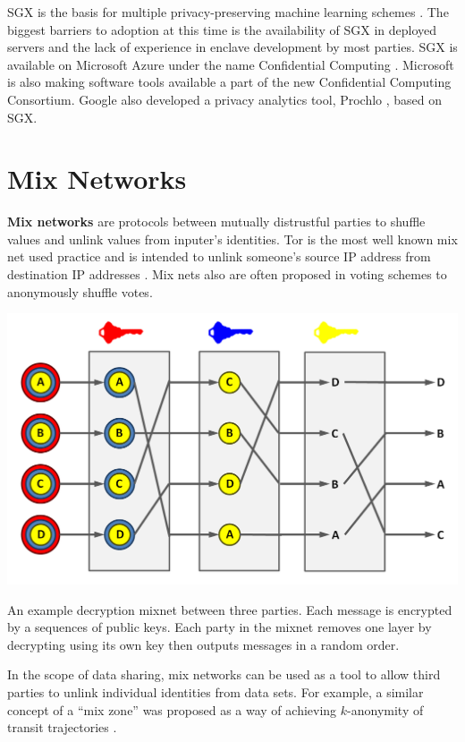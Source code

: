 \documentclass[nobib]{tufte-handout}
\begin{document}
SGX is the basis for multiple privacy-preserving machine learning schemes
\cite{DBLP:conf/eurosp/ChengZKHHJJ0S19,tramer2018slalom,DBLP:journals/corr/abs-1803-05961}.
The biggest barriers to adoption at this time is the availability of SGX in
deployed servers and the lack of experience in enclave development by most
parties. SGX is available on Microsoft Azure under the name Confidential
Computing \cite{azure-confidential-computing}.  Microsoft is also making
software tools available a part of the new Confidential Computing Consortium.
Google also developed a privacy analytics tool, Prochlo \cite{prochlo}, based on
SGX.

\section{Mix Networks}

\textbf{Mix networks} \cite{DBLP:journals/cacm/Chaum81} are protocols between
mutually distrustful parties to shuffle values and unlink values from inputer’s
identities. Tor is the most well known mix net used practice and is intended to
unlink someone's source IP address from destination IP addresses
\cite{DBLP:conf/uss/DingledineMS04}. Mix nets also are often proposed in voting
schemes to anonymously shuffle votes.

\begin{marginfigure} \includegraphics[width=\linewidth]{mixnet} \caption{An
example decryption mixnet between three parties. Each message is encrypted by a
sequences of public keys. Each party in the mixnet removes one layer by
decrypting using its own key then outputs messages in a random order.}
\label{fig:mixnet} \end{marginfigure}

In the scope of data sharing, mix networks can be used as a tool to allow third
parties to unlink individual identities from data sets. For example, a similar
concept of a “mix zone” was proposed as a way of achieving $k$-anonymity of
transit trajectories \cite{freudiger2007mix}.
\end{document}
